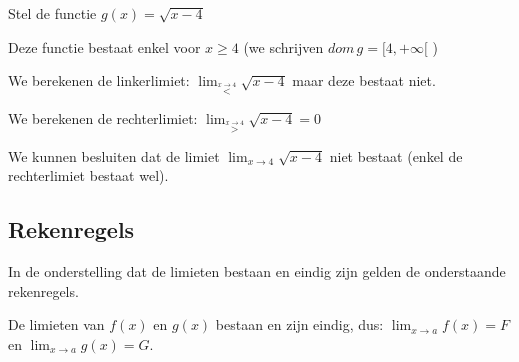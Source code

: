 \begin{voorbeeld}
	
Stel de functie $g(x)=\sqrt{x-4}$



Deze functie bestaat enkel voor $x\geq4$ (we schrijven $dom\,g=[4,+\infty[$
)

We berekenen de linkerlimiet: ${\displaystyle \lim_{\overset{x\rightarrow4}{<}}}\sqrt{x-4}$
maar deze bestaat niet.

We berekenen de rechterlimiet: ${\displaystyle \lim_{\overset{x\rightarrow4}{>}}}\sqrt{x-4}=0$ 

We kunnen besluiten dat de limiet ${\displaystyle \lim_{x\to4}}\sqrt{x-4}$
niet bestaat (enkel de rechterlimiet bestaat wel).

\end{voorbeeld}

\subsection{Rekenregels}

In de onderstelling dat de limieten bestaan en eindig zijn gelden
de onderstaande rekenregels.

De limieten van $f(x)$ en $g(x)$ bestaan en zijn eindig,
dus: ${\displaystyle \lim_{x\to a}}f(x)=F$ en ${\displaystyle \lim_{x\to a}}g(x)=G$.

